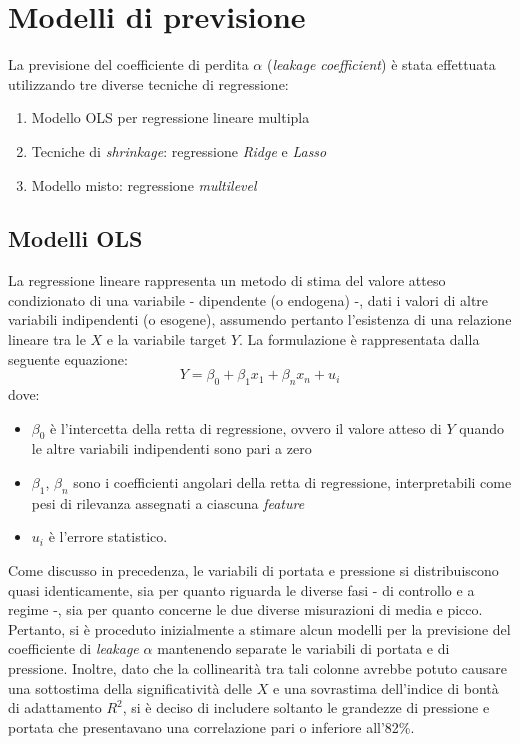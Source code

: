 \documentclass[fleqn,10pt]{SelfArx} %
\begin{document}
\section{Modelli di previsione}\label{Mod}
La previsione del coefficiente di perdita $\alpha$ (\textit{leakage coefficient}) è stata effettuata utilizzando tre diverse tecniche di regressione: 
\begin{enumerate}
    \item Modello OLS per regressione lineare multipla
    \item Tecniche di \textit{shrinkage}: regressione \textit{Ridge} e \textit{Lasso}
    \item Modello misto: regressione \textit{multilevel}
\end{enumerate}
\subsection{Modelli OLS}
La regressione lineare rappresenta un metodo di stima del valore atteso condizionato di una variabile - dipendente (o endogena) -, dati i valori di altre variabili indipendenti (o esogene), assumendo pertanto l'esistenza di una relazione lineare tra le $X$ e
la variabile target $Y$. La formulazione è rappresentata dalla seguente equazione:
\begin{equation}\label{eq}
    Y = \beta_{0} + \beta_{1}x_{1} + \beta_{n}x_{n} + u_{i}
\end{equation}
dove:
\begin{itemize}
    \item $\beta_{0}$ è l'intercetta della retta di regressione, ovvero il valore atteso di $Y$ quando le altre variabili indipendenti sono pari a zero
    \item $\beta_{1}$, $\beta_{n}$ sono i coefficienti angolari della retta di regressione, interpretabili come pesi di rilevanza assegnati a ciascuna \textit{feature}
    \item $u_{i}$ è l'errore statistico.
\end{itemize}
Come discusso in precedenza, le variabili di portata e pressione si distribuiscono quasi identicamente, sia per quanto riguarda le diverse fasi - di controllo e a regime -, sia per quanto concerne le due diverse misurazioni di media e picco. Pertanto, si è proceduto inizialmente a stimare alcun modelli per la previsione del coefficiente di \textit{leakage} $\alpha$ mantenendo separate le variabili di portata e di pressione. Inoltre, dato che la collinearità tra tali colonne avrebbe potuto causare una sottostima della significatività delle $X$ e una sovrastima dell'indice di bontà di adattamento $R^2$, si è deciso di includere soltanto le grandezze di pressione e portata che presentavano una correlazione pari o inferiore all'82\%.\\
\end{document}
